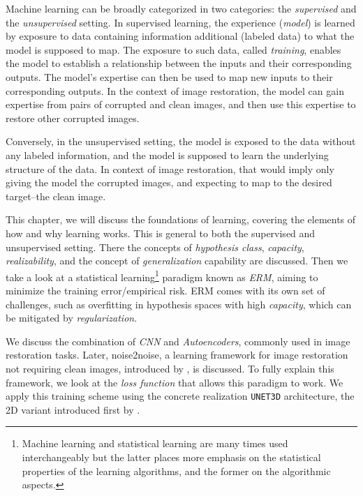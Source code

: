 Machine learning can be broadly categorized in two categories: the \textit{supervised} and the \textit{unsupervised} setting. In supervised learning, the experience (\textit{model}) is learned by exposure to data containing information additional (labeled data) to what the model is supposed to map. The exposure to such data, called \textit{training}, enables the model to establish a relationship between the inputs and their corresponding outputs. The model’s expertise can then be used to map new inputs to their corresponding outputs. In the context of image restoration, the model can gain expertise from pairs of corrupted and clean images, and then use this expertise to restore other corrupted images.

Conversely, in the unsupervised setting, the model is exposed to the data without any labeled information, and the model is supposed to learn the underlying structure of the data. In context of image restoration, that would imply only giving the model the corrupted images, and expecting to map to the desired target--the clean image.

This chapter, we will discuss the foundations of  learning, covering the elements of how and why learning works. This is general to both the supervised and unsupervised setting. There the concepts of \textit{hypothesis class}, \textit{capacity}, \textit{realizability}, and the concept of \textit{generalization} capability are discussed. Then we take a look at a statistical learning\footnote{Machine learning and statistical learning are many times used interchangeably but the latter places more emphasis on the statistical properties of the learning algorithms, and the former on the algorithmic aspects.} paradigm known as \textit{\gls{ERM}}, aiming to minimize the training error/empirical risk. \Gls{ERM} comes with its own set of challenges, such as overfitting in hypothesis spaces with high \textit{capacity}, which can be mitigated by \textit{regularization}. 

We discuss the combination of \textit{\gls{CNN}} and \textit{Autoencoders}, commonly used in image restoration tasks. Later, \gls{noise2noise}, a learning framework for image restoration not requiring clean images, introduced by \citeauthor{lehtinenNoise2NoiseLearningImage2018}, is discussed. To fully explain this framework, we look at the \textit{loss function} that allows this paradigm to work. We apply this training scheme using the concrete realization \texttt{UNET3D} architecture, the 2D variant introduced first by \citeauthor{ronnebergerUNetConvolutionalNetworks}.

